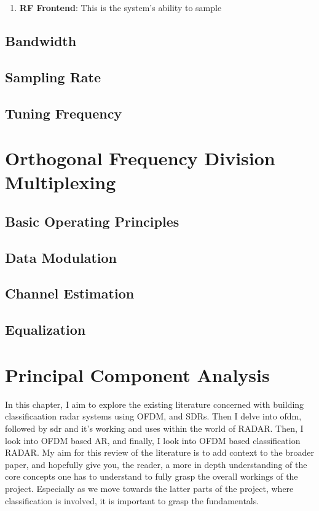 \documentclass[11pt]{report}
\begin{document}
\begin{enumerate}
    \item \textbf{RF Frontend}: This is the system's ability to sample
\end{enumerate}



\subsection{Bandwidth}
\subsection{Sampling Rate}
\subsection{Tuning Frequency}


\section{Orthogonal Frequency Division Multiplexing}

\subsection{Basic Operating Principles}
\subsection{Data Modulation}
\subsection{Channel Estimation}
\subsection{Equalization}


\section{Principal Component Analysis}

In this chapter, I aim to explore the existing literature concerned with building classificaation radar systems using OFDM, and SDRs. Then I delve into \gls{ofdm}, followed by \gls{sdr} and it's working and uses within the world of RADAR. Then, I look into OFDM based AR, and finally, I look into OFDM based classification RADAR. My aim for this review of the literature is to add context to the broader paper, and hopefully give you, the reader, a more in depth understanding of the core concepts one has to understand to fully grasp the overall workings of the project. Especially as we move towards the latter parts of the project, where classification is involved, it is important to grasp the fundamentals.
\end{document}

